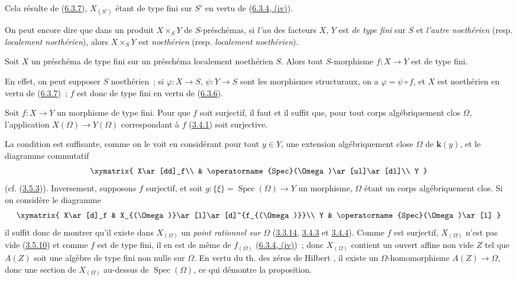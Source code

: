 Cela résulte de (\hyperref[I.6.3.7-fr]{6.3.7}), $X_{(S')}$ étant de type fini
sur $S'$ en vertu de (\hyperref[I.6.3.4-fr]{6.3.4, (iv)}).

On peut encore dire que dans un produit $X\times_S Y$ de $S$-préschémas, si
\emph{l'un} des
facteurs $X$, $Y$ est \emph{de type fini} sur $S$ et
\emph{l'autre noethérien} (resp. \emph{localement noethérien}), alors
$X\times_S Y$ est \emph{noethérien} (resp. \emph{localement noethérien}).

\begin{corollary}[6.3.9]
\label{I.6.3.9-fr}
Soit $X$ un préschéma de type fini sur un préschéma localement noethérien $S$.
Alors tout $S$-morphisme $f:X\to Y$ est de type fini.
\end{corollary}

En effet, on peut supposer $S$ noethérien~; si $\varphi:X\to S$,
$\psi:Y\to S$ sont les morphismes structuraux, on a $\varphi=\psi\circ f$, et
$X$ est noethérien en vertu de (\hyperref[I.6.3.7-fr]{6.3.7})~; $f$ est donc
de type fini en vertu de (\hyperref[I.6.3.6-fr]{6.3.6}).

\begin{proposition}[6.3.10]
\label{I.6.3.10-fr}
Soit $f:X\to Y$ un morphisme de type fini. Pour que $f$ soit surjectif, il faut
et il suffit que, pour tout corps \textup{algébriquement clos} $\Omega$, l'application
$X(\Omega)\to Y(\Omega)$ correspondant à $f$
\textup{(\hyperref[I.3.4.1-fr]{3.4.1})} soit surjective.
\end{proposition}

La condition est suffisante, comme on le voit en considérant pour tout
$y\in Y$, une extension algébriquement close $\Omega$ de $\boldsymbol{k}(y)$, et le
diagramme commutatif
\[
  \xymatrix{
    X\ar[dd]_f\\
    & \operatorname{Spec}(\Omega)\ar[ul]\ar[dl]\\
    Y
  }
\]
(cf. (\hyperref[I.3.5.3-fr]{3.5.3})). Inversement, supposons $f$
surjectif, et soit $g:\{\xi\}=\operatorname{Spec}(\Omega)\to Y$ un morphisme,
$\Omega$ étant un corps algébriquement clos. Si on considère le diagramme
\[
  \xymatrix{
    X\ar[d]_f &
    X_{(\Omega)}\ar[l]\ar[d]^{f_{(\Omega)}}\\
    Y &
    \operatorname{Spec}(\Omega)\ar[l]
  }
\]
il suffit donc de montrer qu'il existe dans $X_{(\Omega)}$ un
\emph{point rationnel sur $\Omega$}
(\hyperref[I.3.3.14-fr]{3.3.14}, \hyperref[I.3.4.3-fr]{3.4.3} et
\hyperref[I.3.4.4-fr]{3.4.4}). Comme $f$ est surjectif, $X_{(\Omega)}$ n'est
pas vide (\hyperref[I.3.5.10-fr]{3.5.10}) et comme $f$ est de type fini, il en
est de même de $f_{(\Omega)}$ (\hyperref[I.6.3.4-fr]{6.3.4, (iv)})~; donc
$X_{(\Omega)}$ contient un ouvert affine non vide $Z$ tel que $A(Z)$ soit une
algèbre de type fini non nulle sur $\Omega$. En vertu du th. des zéros de
Hilbert \cite{I-21}, il existe un $\Omega$-homomorphisme $A(Z)\to\Omega$, donc
une section de $X_{(\Omega)}$ au-dessus de $\operatorname{Spec}(\Omega)$, ce
qui démontre la proposition.

